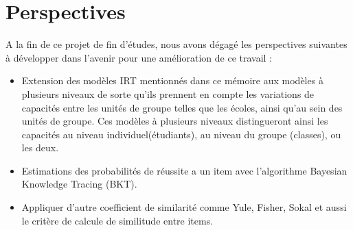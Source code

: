 \section*{\textbf{Perspectives}}
A la fin de ce projet de fin d’études, nous avons dégagé les perspectives suivantes à développer dans l’avenir pour une amélioration de ce travail :

\begin{itemize}
    \item Extension des modèles IRT mentionnés dans ce mémoire aux modèles à plusieurs niveaux de sorte qu'ils prennent en compte les variations de capacités entre les unités de groupe telles que les écoles, ainsi qu'au sein des unités de groupe. Ces modèles à plusieurs niveaux distingueront ainsi les capacités au niveau individuel(étudiants), au niveau du groupe (classes), ou les deux.
    \item Estimations des probabilités de réussite a un item avec l’algorithme Bayesian Knowledge Tracing (BKT).
    \item Appliquer d’autre coefficient de similarité comme Yule, Fisher, Sokal et aussi le critère de calcule de similitude entre items.
\end{itemize}



